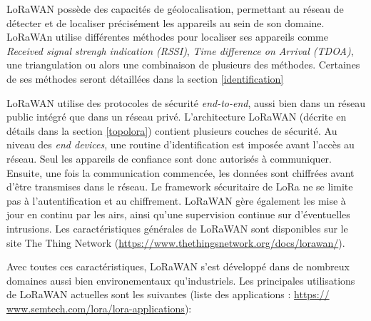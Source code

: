 \vspace{0.1cm}

LoRaWAN possède des capacités de géolocalisation, permettant au réseau de détecter et de localiser précisément les appareils au sein de son domaine. LoRaWAn utilise différentes méthodes pour localiser ses appareils comme \textit{Received signal strengh indication (RSSI)}, \textit{Time difference on Arrival (TDOA)}, une triangulation ou alors une combinaison de plusieurs des méthodes. Certaines de ses méthodes seront détaillées dans la section \ref{identification}

\vspace{0.1cm}

LoRaWAN utilise des protocoles de sécurité \textit{end-to-end}, aussi bien dans un réseau public intégré que dans un réseau privé. L'architecture LoRaWAN (décrite en détails dans la section \ref{topolora}) contient plusieurs couches de sécurité. Au niveau des \textit{end devices}, une routine d'identification est imposée avant l'accès au réseau. Seul les appareils de confiance sont donc autorisés à communiquer. Ensuite, une fois la communication commencée, les données sont chiffrées avant d'être transmises dans le réseau. Le framework sécuritaire de LoRa ne se limite pas à l'autentification et au chiffrement. LoRaWAN gère également les mise à jour en continu par les airs, ainsi qu'une supervision continue sur d'éventuelles intrusions. Les caractéristiques générales de LoRaWAN sont disponibles sur le site The Thing Network (\href{https://www.thethingsnetwork.org/docs/lorawan/}{https://www.thethingsnetwork.org/docs/lorawan/}).

\vspace{0.1cm}

Avec toutes ces caractéristiques, LoRaWAN s'est développé dans de nombreux domaines aussi bien environementaux qu'industriels. Les principales utilisations de LoRaWAN actuelles sont les suivantes (liste des applications : \href{https://www.semtech.com/lora/lora-applications}{https:// \\ www.semtech.com/lora/lora-applications}):

\vspace{0.1cm}

